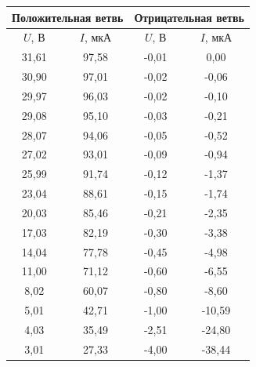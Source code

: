 \documentclass[a4paper,12pt]{article} %
\begin{document}
\begin{table}[h!]
	\centering
		\begin{tabular}{|cc|cc|}
			\hline
			\multicolumn{2}{|c|}{Положительная ветвь} & \multicolumn{2}{c|}{Отрицательная ветвь} \\ \hline
			\multicolumn{1}{|c|}{$U$, В}  & $I$, мкА  & \multicolumn{1}{c|}{$U$, В}  & $I$, мкА  \\ \hline
			\multicolumn{1}{|c|}{31,61}   & 97,58     & \multicolumn{1}{c|}{-0,01}   & 0,00      \\ \hline
			\multicolumn{1}{|c|}{30,90}   & 97,01     & \multicolumn{1}{c|}{-0,02}   & -0,06     \\ \hline
			\multicolumn{1}{|c|}{29,97}   & 96,03     & \multicolumn{1}{c|}{-0,02}   & -0,10     \\ \hline
			\multicolumn{1}{|c|}{29,08}   & 95,10     & \multicolumn{1}{c|}{-0,03}   & -0,21     \\ \hline
			\multicolumn{1}{|c|}{28,07}   & 94,06     & \multicolumn{1}{c|}{-0,05}   & -0,52     \\ \hline
			\multicolumn{1}{|c|}{27,02}   & 93,01     & \multicolumn{1}{c|}{-0,09}   & -0,94     \\ \hline
			\multicolumn{1}{|c|}{25,99}   & 91,74     & \multicolumn{1}{c|}{-0,12}   & -1,37     \\ \hline
			\multicolumn{1}{|c|}{23,04}   & 88,61     & \multicolumn{1}{c|}{-0,15}   & -1,74     \\ \hline
			\multicolumn{1}{|c|}{20,03}   & 85,46     & \multicolumn{1}{c|}{-0,21}   & -2,35     \\ \hline
			\multicolumn{1}{|c|}{17,03}   & 82,19     & \multicolumn{1}{c|}{-0,30}   & -3,38     \\ \hline
			\multicolumn{1}{|c|}{14,04}   & 77,78     & \multicolumn{1}{c|}{-0,45}   & -4,98     \\ \hline
			\multicolumn{1}{|c|}{11,00}   & 71,12     & \multicolumn{1}{c|}{-0,60}   & -6,55     \\ \hline
			\multicolumn{1}{|c|}{8,02}    & 60,07     & \multicolumn{1}{c|}{-0,80}   & -8,60     \\ \hline
			\multicolumn{1}{|c|}{5,01}    & 42,71     & \multicolumn{1}{c|}{-1,00}   & -10,59    \\ \hline
			\multicolumn{1}{|c|}{4,03}    & 35,49     & \multicolumn{1}{c|}{-2,51}   & -24,80    \\ \hline
			\multicolumn{1}{|c|}{3,01}    & 27,33     & \multicolumn{1}{c|}{-4,00}   & -38,44    \\ \hline

\end{tabular}
\end{table}
\end{document}
